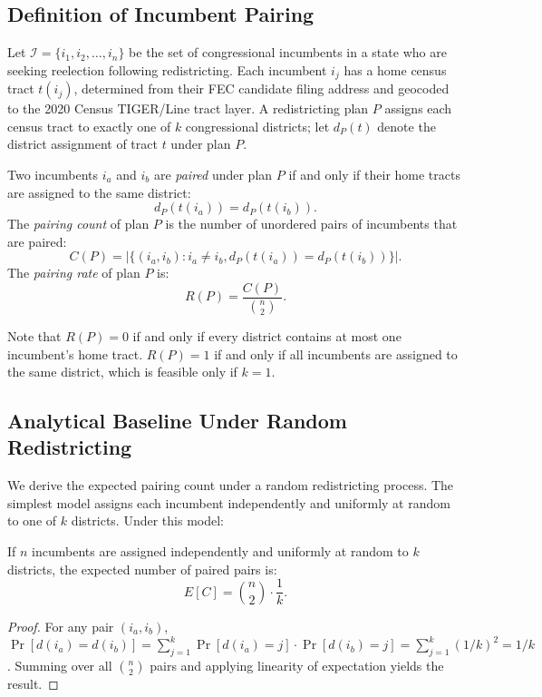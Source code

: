 \label{sec:background}

\subsection{Definition of Incumbent Pairing}

Let $\mathcal{I} = \{i_1, i_2, \ldots, i_n\}$ be the set of congressional incumbents in
a state who are seeking reelection following redistricting. Each incumbent $i_j$ has a
home census tract $t(i_j)$, determined from their FEC candidate filing address and
geocoded to the 2020 Census TIGER/Line tract layer. A redistricting plan $P$ assigns
each census tract to exactly one of $k$ congressional districts; let $d_P(t)$ denote
the district assignment of tract $t$ under plan $P$.

\begin{definition}
Two incumbents $i_a$ and $i_b$ are \emph{paired} under plan $P$ if and only if their
home tracts are assigned to the same district:
\[
  d_P(t(i_a)) = d_P(t(i_b)).
\]
The \emph{pairing count} of plan $P$ is the number of unordered pairs of incumbents
that are paired:
\[
  C(P) = \left|\{(i_a, i_b) : i_a \neq i_b, d_P(t(i_a)) = d_P(t(i_b))\}\right|.
\]
The \emph{pairing rate} of plan $P$ is:
\[
  R(P) = \frac{C(P)}{\binom{n}{2}}.
\]
\end{definition}

Note that $R(P) = 0$ if and only if every district contains at most one incumbent's
home tract. $R(P) = 1$ if and only if all incumbents are assigned to the same district,
which is feasible only if $k=1$.

\subsection{Analytical Baseline Under Random Redistricting}

We derive the expected pairing count under a random redistricting process. The simplest
model assigns each incumbent independently and uniformly at random to one of $k$
districts. Under this model:

\begin{proposition}
If $n$ incumbents are assigned independently and uniformly at random to $k$ districts,
the expected number of paired pairs is:
\[
  E[C] = \binom{n}{2} \cdot \frac{1}{k}.
\]
\end{proposition}

\begin{proof}
For any pair $(i_a, i_b)$, $\Pr[d(i_a) = d(i_b)] = \sum_{j=1}^{k} \Pr[d(i_a)=j] \cdot
\Pr[d(i_b)=j] = \sum_{j=1}^k (1/k)^2 = 1/k$. Summing over all $\binom{n}{2}$ pairs
and applying linearity of expectation yields the result.
\end{proof}

